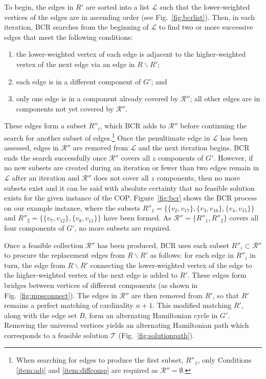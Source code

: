 \documentclass[authoryear]{elsarticle}
\begin{document}
To begin, the edges in $R'$ are sorted into a list $\mathcal{L}$ such that the lower-weighted vertices of the edges are in ascending order (see Fig.~\ref{fig:bcrlist}). Then, in each iteration, BCR searches from the beginning of $\mathcal{L}$ to find two or more successive edges that meet the following conditions:
\begin{enumerate}[label={(\roman*)},itemsep=-2pt,topsep=2pt]
	\item the lower-weighted vertex of each edge is adjacent to the higher-weighted vertex of the next edge via an edge in $R\backslash R'$;\label{item:adj}
	\item each edge is in a different component of $G'$; \label{item:diffcomp} and
	\item only one edge is in a component already covered by $\mathcal{R}''$; all other edges are in components not yet covered by $\mathcal{R}''$.\label{item:overlap}
\end{enumerate} 
These edges form a subset $R''_i$, which BCR adds to $\mathcal{R}''$ before continuing the search for another subset of edges.\footnote{When searching for edges to produce the first subset, $R''_1$, only Conditions \ref{item:adj} and \ref{item:diffcomp} are required as $\mathcal{R}'' = \emptyset$.} Once the penultimate edge in $\mathcal{L}$ has been assessed, edges in $\mathcal{R}''$ are removed from $\mathcal{L}$ and the next iteration begins. BCR ends the search successfully once $\mathcal{R}''$ covers all $z$ components of $G'$. However, if no new subsets are created during an iteration or fewer than two edges remain in $\mathcal{L}$ after an iteration and $\mathcal{R}''$ does not cover all $z$ components, then no more subsets exist and it can be said with absolute certainty that no feasible solution exists for the given instance of the COP. Figure~\ref{fig:bcr} shows the BCR process on our example instance, where the subsets $R''_1 = \{\{v_2, v_{17}\},\{v_3, v_{16}\}, \{v_4, v_{15}\}\}$ and $R''_2 = \{\{v_7, v_{12}\}, \{v_8, v_{11}\}\}$ have been formed. As $\mathcal{R}'' =\{R''_1, R''_2\}$ covers all four components of $G'$, no more subsets are required.

Once a feasible collection $\mathcal{R}''$ has been produced, BCR uses each subset $R''_i \subset \mathcal{R}''$ to procure the replacement edges from $R\backslash R'$ as follows: for each edge in $R''_i$ in turn, the edge from $R \backslash R'$ connecting the lower-weighted vertex of the edge to the higher-weighted vertex of the next edge is added to $R'$. These edges form bridges between vertices of different components (as shown in Fig.~\ref{fig:mpsconnect}). The edges in $\mathcal{R}''$ are then removed from $R'$, so that $R'$ remains a perfect matching of cardinality $n+1$. This modified matching $R'$, along with the edge set $B$, form an alternating Hamiltonian cycle in $G'$. Removing the universal vertices yields an alternating Hamiltonian path which corresponds to a feasible solution $\mathcal{T}$ (Fig.~\ref{fig:solutionpath}).
\end{document}

